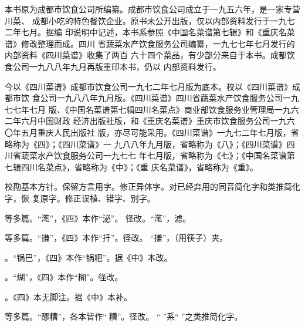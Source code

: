 \vspace{.6875\baselineskip}%
\begin{list}{}{%
	\setlength{\topsep}{0pt}%
	\setlength{\leftmargin}{1.5bp}%
	\setlength{\rightmargin}{1.5bp}%
	\setlength{\listparindent}{\parindent}%
	\setlength{\itemindent}{\parindent}%
	\setlength{\parsep}{\parskip}%
}%
\item[]%

本书原为成都市饮食公司所编纂。成都市饮食公司成立于一九五六年，是一家专营川菜、
成都小吃的特色餐饮企业。原书未公开出版，仅以内部资料发行于一九七二年七月。据编
印说明中记述，本书系参照《中国名菜谱第七辑》和《重庆名菜谱》修改整理而成。四川
省蔬菜水产饮食服务公司编纂，一九七七年七月发行的内部资料《四川菜谱》收集了两百
六十四个菜品，有少部分来自于本书。成都饮食公司一九八八年九月再版重印本书，仍以
内部资料发行。

今以《四川菜谱》成都市饮食公司一九七二年七月版为底本。校以《四川菜谱》成都市饮
食公司一九八八年九月版。《四川菜谱》四川省蔬菜水产饮食服务公司一九七七年七月
版、《中国名菜谱第七辑四川名菜点》商业部饮食服务业管理局一九六二年六月中国财政
经济出版社版，和《重庆名菜谱》重庆市饮食服务公司一九六〇年五月重庆人民出版社
版，亦尽可能采用。《四川菜谱》一九七二年七月版，省略称为《四》；《四川菜谱》一
九八八年九月版，省略称为《八》；《四川菜谱》四川省蔬菜水产饮食服务公司一九七七
年七月版，省略称为《七》；《中国名菜谱第七辑四川名菜点》，省略称为《中》；《重
庆名菜谱》，省略称为《重》。

校勘基本方针。保留方言用字。修正异体字。对已经弃用的同音简化字和类推简化字，恢
复原字。修正误植、错字、别字。

\vspace{.5\baselineskip plus .5\baselineskip minus .5\baselineskip}%
{\noindent\null\hfill{}\hfill\null}%
\vspace{1\baselineskip plus .5\baselineskip minus .5\baselineskip}%

等多篇。“滗”，《四》本作“泌”。
径改。“滗”，滤。

等多篇。“搛”，《四》本作“扦”。径改。
“搛”，（用筷子）夹。

。“锅巴”，《四》本作“锅粑”。据《中》本改。

。“煳”，《四》本作“糊”。径改。

。《四》本无脚注{\footnotesize{}}。据《中》本补。

等多篇。“醪糟”，各本皆作“𰪿糟”。径改。
“𰪿”系“𫃑”之类推简化字。


\end{list}
